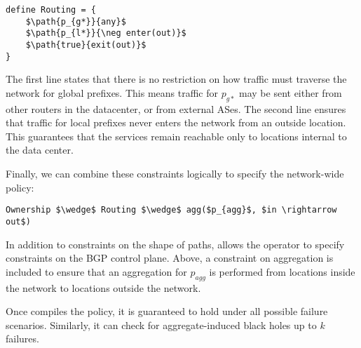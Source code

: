\begin{lstlisting}[mathescape=true]
define Routing = {
    $\path{p_{g*}}{any}$
    $\path{p_{l*}}{\neg enter(out)}$
    $\path{true}{exit(out)}$
}
\end{lstlisting}

The first line states that there is no restriction on how traffic must traverse the network for global prefixes. This means traffic for $p_{g*}$ may be sent either from other routers in the datacenter, or from external ASes. The second line ensures that traffic for local prefixes never enters the network from an outside location. This  guarantees that the services remain reachable only to locations internal to the data center.

Finally, we can combine these constraints logically to specify the network-wide policy:

\begin{lstlisting}[mathescape=true]
Ownership $\wedge$ Routing $\wedge$ agg($p_{agg}$, $in \rightarrow out$)
\end{lstlisting}


In addition to constraints on the shape of paths, \sysname allows the operator to specify constraints on the BGP control plane. Above, a constraint on aggregation is included to ensure that an aggregation for $p_{agg}$ is performed from locations inside the network to locations outside the network.

Once \sysname compiles the policy, it is guaranteed to hold under all possible failure scenarios. Similarly, it can check for aggregate-induced black holes up to $k$ failures. 




